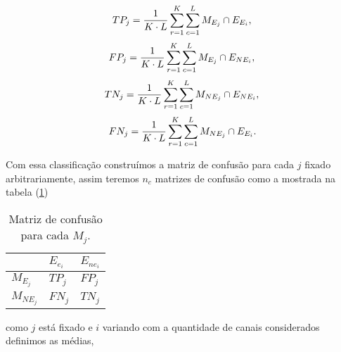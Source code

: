 \begin{equation}\label{eq:verdadeiro_positivo_j}
	TP_j= \frac{1}{K\cdot L}\sum_{r=1}^{K}\sum_{c=1}^{L} M_{E_j}\cap E_{E_i}, \\
\end{equation}
\begin{equation}\label{eq:falso_positivo_j}
	FP_j= \frac{1}{K\cdot L}\sum_{r=1}^{K}\sum_{c=1}^{L} M_{E_j}\cap E_{NE_i}, \\
\end{equation}
\begin{equation}\label{eq:verdadeiro_negativo_j}
	TN_j= \frac{1}{K\cdot L}\sum_{r=1}^{K}\sum_{c=1}^{L} M_{NE_j}\cap E_{NE_i}, \\
\end{equation}
\begin{equation}\label{eq:falso_negativo_j}
	FN_j= \frac{1}{K\cdot L}\sum_{r=1}^{K}\sum_{c=1}^{L} M_{NE_j}\cap E_{E_i}. \\
\end{equation}

Com essa classificação construímos a matriz de confusão para cada $j$ fixado arbitrariamente, assim teremos $n_c$ matrizes de confusão como a mostrada na tabela (\ref{tab03:cap_fusao})
\begin{table}[htb!]
	\centering
	\caption{Matriz de confusão para cada $M_j$.}\label{tab03:cap_fusao}
\begin{tabular}{@{}lll@{}} \toprule
	& $E_{e_i}$  & $E_{ne_i}$  \\ \midrule
	$M_{E_j}$    & $TP_j$ &  $FP_j$  \\ 
	$M_{NE_j}$   & $FN_j$ &  $TN_j$\\ \bottomrule 
\end{tabular}
\end{table}
como $j$ está fixado e $i$ variando com a quantidade de canais considerados definimos as médias,

